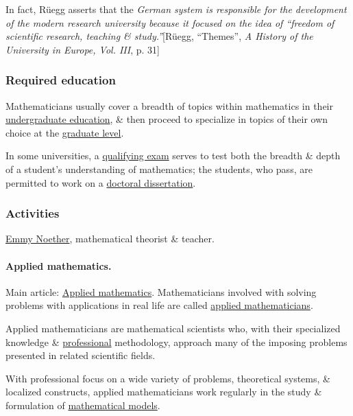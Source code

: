 \documentclass{article}
\begin{document}
In fact, Rüegg asserts that the \textit{German system is responsible for the development of the modern research university because it focused on the idea of ``freedom of scientific research, teaching \& study.''}[Rüegg, ``Themes'', \textit{A History of the University in Europe, Vol. III}, p. 31]

\subsubsection{Required education}
Mathematicians usually cover a breadth of topics within mathematics in their \href{https://en.wikipedia.org/wiki/Undergraduate_education}{undergraduate education}, \& then proceed to specialize in topics of their own choice at the \href{https://en.wikipedia.org/wiki/Graduate-level}{graduate level}.

In some universities, a \href{https://en.wikipedia.org/wiki/Qualifying_exam}{qualifying exam} serves to test both the breadth \& depth of a student's understanding of mathematics; the students, who pass, are permitted to work on a \href{https://en.wikipedia.org/wiki/Doctoral_dissertation}{doctoral dissertation}.

\subsubsection{Activities}
\textsf{\href{https://en.wikipedia.org/wiki/Emmy_Noether}{Emmy Noether}, mathematical theorist \& teacher.}

\paragraph{Applied mathematics.} Main article: \href{https://en.wikipedia.org/wiki/Applied_mathematics}{Applied mathematics}. Mathematicians involved with solving problems with applications in real life are called \href{https://en.wikipedia.org/wiki/Applied_mathematician}{applied mathematicians}.

Applied mathematicians are mathematical scientists who, with their specialized knowledge \& \href{https://en.wikipedia.org/wiki/Professional}{professional} methodology, approach many of the imposing problems presented in related scientific fields.

With professional focus on a wide variety of problems, theoretical systems, \& localized constructs, applied mathematicians work regularly in the study \& formulation of \href{https://en.wikipedia.org/wiki/Mathematical_models}{mathematical models}.
\end{document}
